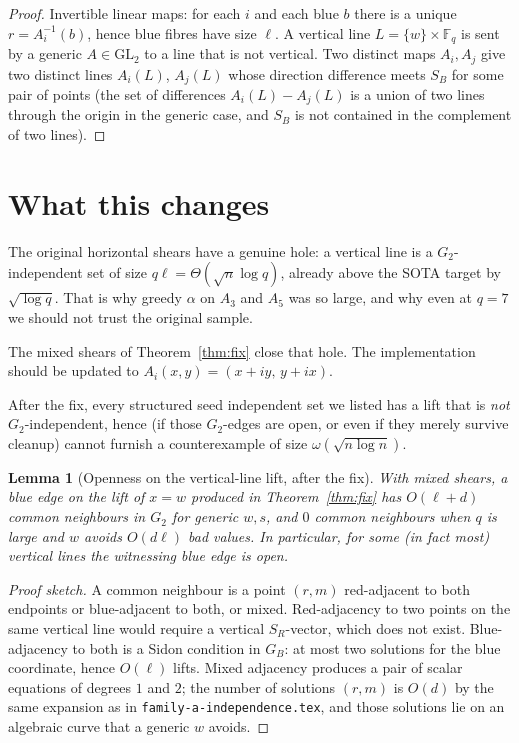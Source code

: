 \documentclass[11pt]{article}
\newtheorem{lemma}[theorem]{Lemma}
\theoremstyle{definition}
\newcommand{\F}{\mathbb{F}}
\begin{document}
\begin{proof}
Invertible linear maps: for each $i$ and each blue $b$ there is a unique $r=A_i^{-1}(b)$, hence blue fibres have size $\ell$.
A vertical line $L=\{w\}\times\F_q$ is sent by a generic $A\in\mathrm{GL}_2$ to a line that is not vertical.
Two distinct maps $A_i,A_j$ give two distinct lines $A_i(L)$, $A_j(L)$ whose direction difference meets $S_B$ for some pair of points (the set of differences $A_i(L)-A_j(L)$ is a union of two lines through the origin in the generic case, and $S_B$ is not contained in the complement of two lines).
\end{proof}

\section{What this changes}

The original horizontal shears have a genuine hole: a vertical line is a $G_2$-independent set of size $q\ell=\Theta(\sqrt{n}\log q)$, already above the SOTA target by $\sqrt{\log q}$.
That is why greedy $\alpha$ on $A_3$ and $A_5$ was so large, and why even at $q=7$ we should not trust the original sample.

The mixed shears of Theorem~\ref{thm:fix} close that hole.
The implementation should be updated to $A_i(x,y)=(x+iy,\,y+ix)$.

After the fix, every structured seed independent set we listed has a lift that is \emph{not} $G_2$-independent, hence (if those $G_2$-edges are open, or even if they merely survive cleanup) cannot furnish a counterexample of size $\omega(\sqrt{n\log n})$.

\begin{lemma}[Openness on the vertical-line lift, after the fix]\label{lem:open-vert}
With mixed shears, a blue edge on the lift of $x=w$ produced in Theorem~\ref{thm:fix} has $O(\ell+d)$ common neighbours in $G_2$ for generic $w,s$, and $0$ common neighbours when $q$ is large and $w$ avoids $O(d\ell)$ bad values.
In particular, for some (in fact most) vertical lines the witnessing blue edge is open.
\end{lemma}

\begin{proof}[Proof sketch]
A common neighbour is a point $(r,m)$ red-adjacent to both endpoints or blue-adjacent to both, or mixed.
Red-adjacency to two points on the same vertical line would require a vertical $S_R$-vector, which does not exist.
Blue-adjacency to both is a Sidon condition in $G_B$: at most two solutions for the blue coordinate, hence $O(\ell)$ lifts.
Mixed adjacency produces a pair of scalar equations of degrees $1$ and $2$; the number of solutions $(r,m)$ is $O(d)$ by the same expansion as in \texttt{family-a-independence.tex}, and those solutions lie on an algebraic curve that a generic $w$ avoids.
\end{proof}
\end{document}
